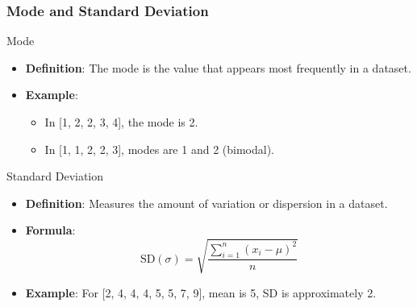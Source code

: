\documentclass{beamer}
\begin{document}
\begin{frame}[fragile]
    \frametitle{Mode and Standard Deviation}
    \begin{block}{Mode}
        \begin{itemize}
            \item \textbf{Definition}: The mode is the value that appears most frequently in a dataset.
            \item \textbf{Example}: 
            \begin{itemize}
                \item In [1, 2, 2, 3, 4], the mode is 2.
                \item In [1, 1, 2, 2, 3], modes are 1 and 2 (bimodal).
            \end{itemize}
        \end{itemize}
    \end{block}

    \begin{block}{Standard Deviation}
        \begin{itemize}
            \item \textbf{Definition}: Measures the amount of variation or dispersion in a dataset.
            \item \textbf{Formula}:
            \[
            \text{SD} (\sigma) = \sqrt{\frac{\sum_{i=1}^{n} (x_i - \mu)^2}{n}}
            \]
            \item \textbf{Example}: For [2, 4, 4, 4, 5, 5, 7, 9], mean is 5, SD is approximately 2.
        \end{itemize}
    \end{block}
\end{frame}
\end{document}
